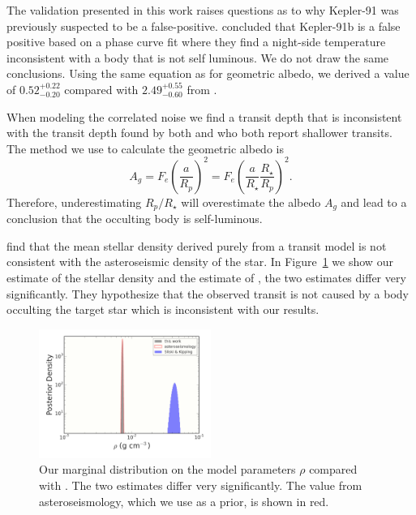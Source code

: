 \documentclass[apjl]{emulateapj}
\begin{document}
The validation presented in this work raises questions as to why Kepler-91 was previously suspected to be a false-positive. \citet{esteves13} concluded that Kepler-91b is a false positive based on a phase curve fit where they find a night-side temperature inconsistent with a body that is not self luminous. We do not draw the same conclusions. Using the same equation as \citeauthor{esteves13} for geometric albedo, we derived a value of $0.52^{+0.22}_{-0.20}$ compared with $2.49^{+0.55}_{-0.60}$ from \citeauthor{esteves13}. 

When modeling the correlated noise we find a transit depth that is inconsistent with the transit depth found by both \citet{esteves13} and \citet{sliski14} who both report shallower transits. The method we use to calculate the geometric albedo is
\begin{equation}
A_g = F_e \left(\frac{a}{R_p}\right)^{2} = F_e \left(\frac{a}{R_{\star}}\frac{R_{\star}}{R_{p}}\right)^{2} .
\end{equation}
Therefore, underestimating $R_{p}/R_{\star}$ will overestimate the albedo $A_g$ and lead to a conclusion that the occulting body is self-luminous.


\citet{sliski14} find that the mean stellar density derived purely from a transit model is not consistent with the asteroseismic density of the star. In Figure~\ref{fig:rho} we show our estimate of the stellar density and the estimate of \citet{sliski14}, the two estimates differ very significantly. They hypothesize that the observed transit is not caused by a body occulting the target star which is inconsistent with our results.

 \begin{figure}
\includegraphics[width=0.50\textwidth]{rho.pdf}
\caption{Our marginal distribution on the model parameters $\rho$ compared with \citet{sliski14}. The two estimates differ very significantly. The value from asteroseismology, which we use as a prior, is shown in red.}
\label{fig:rho}
\end{figure}
\end{document}
